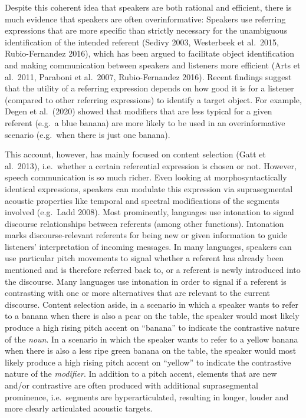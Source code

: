 \documentclass[
  english,
  man]{apa6}
\begin{document}
Despite this coherent idea that speakers are both rational and efficient, there is much evidence that speakers are often overinformative: Speakers use referring expressions that are more specific than strictly necessary for the unambiguous identification of the intended referent (Sedivy 2003, Westerbeek et al.~2015, Rubio-Fernandez 2016), which has been argued to facilitate object identification and making communication between speakers and listeners more efficient (Arts et al.~2011, Paraboni et al.~2007, Rubio-Fernandez 2016).
Recent findings suggest that the utility of a referring expression depends on how good it is for a listener (compared to other referring expressions) to identify a target object.
For example, Degen et al.~(2020) showed that modifiers that are less typical for a given referent (e.g.~a blue banana) are more likely to be used in an overinformative scenario (e.g.~when there is just one banana).

This account, however, has mainly focused on content selection (Gatt et al.~2013), i.e.~whether a certain referential expression is chosen or not.
However, speech communication is so much richer.
Even looking at morphosyntactically identical expressions, speakers can modulate this expression via suprasegmental acoustic properties like temporal and spectral modifications of the segments involved (e.g.~Ladd 2008).
Most prominently, languages use intonation to signal discourse relationships between referents (among other functions).
Intonation marks discourse-relevant referents for being new or given information to guide listeners' interpretation of incoming messages.
In many languages, speakers can use particular pitch movements to signal whether a referent has already been mentioned and is therefore referred back to, or a referent is newly introduced into the discourse.
Many languages use intonation in order to signal if a referent is contrasting with one or more alternatives that are relevant to the current discourse.
Content selection aside, in a scenario in which a speaker wants to refer to a banana when there is also a pear on the table, the speaker would most likely produce a high rising pitch accent on \enquote{banana} to indicate the contrastive nature of the \emph{noun}.
In a scenario in which the speaker wants to refer to a yellow banana when there is also a less ripe green banana on the table, the speaker would most likely produce a high rising pitch accent on \enquote{yellow} to indicate the contrastive nature of the \emph{modifier}. In addition to a pitch accent, elements that are new and/or contrastive are often produced with additional suprasegmental prominence, i.e.~segments are hyperarticulated, resulting in longer, louder and more clearly articulated acoustic targets.
\end{document}
